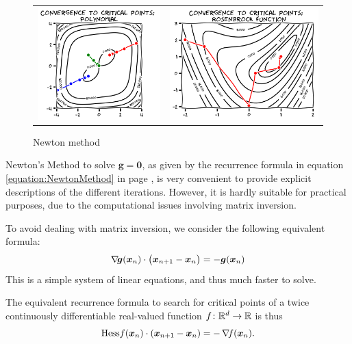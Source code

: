 \begin{figure}[ht!]
\begin{tabular}{cc}
\includegraphics[width=0.45\linewidth]{convergenceNewton.png} &
\includegraphics[width=0.55\linewidth]{convergenceNewtonRosenbrock.png} 
\end{tabular}
\caption{Newton method}
\label{figure:NewtonConvergence}
\end{figure}

\begin{remark}
Newton's Method to solve $\boldsymbol{g}=\boldsymbol{0}$, as given by the recurrence formula in equation \eqref{equation:NewtonMethod} in page \pageref{equation:NewtonMethod}, is very convenient to provide explicit descriptions of the different iterations.  However, it is hardly suitable for practical purposes, due to the computational issues involving matrix inversion.

To avoid dealing with matrix inversion, we consider the following equivalent formula:
\begin{equation}
\mathop{\nabla\! {\boldsymbol{g}}}(\boldsymbol{x}_n) \cdot \big( \boldsymbol{x}_{n+1} - \boldsymbol{x}_n \big) = -\boldsymbol{g}(\boldsymbol{x}_n)
\end{equation}
This is a simple system of linear equations, and thus much faster to solve.  

The equivalent recurrence formula to search for critical points of a twice continuously differentiable real-valued function $f \colon \mathbb{R}^d \to \mathbb{R}$ is thus
\begin{equation}
\mathop{\mathrm{Hess}{f}}(\boldsymbol{x}_n) \cdot (\boldsymbol{x}_{n+1}-\boldsymbol{x}_n) = -\mathop{\nabla\! {f}}(\boldsymbol{x}_n).
\end{equation}
\end{remark}

